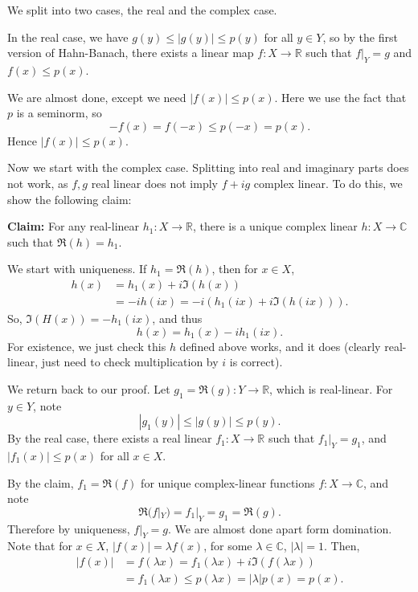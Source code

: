 \documentclass[12pt]{article}
\begin{document}
\begin{proofbox}
	We split into two cases, the real and the complex case.

	In the real case, we have $g(y) \leq |g(y)| \leq p(y)$ for all $y \in Y$, so by the first version of Hahn-Banach, there exists a linear map $f : X \to \mathbb{R}$ such that $f|_Y = g$ and $f(x) \leq p(x)$.

	We are almost done, except we need $|f(x)| \leq p(x)$. Here we use the fact that $p$ is a seminorm, so
	\[
	-f(x) = f(-x) \leq p(-x) = p(x).
	\]
	Hence $|f(x)| \leq p(x)$.

	Now we start with the complex case. Splitting into real and imaginary parts does not work, as $f, g$ real linear does not imply $f + ig$ complex linear. To do this, we show the following claim:

	\textbf{Claim:} For any real-linear $h_1 : X \to \mathbb{R}$, there is a unique complex linear $h : X \to \mathbb{C}$ such that $\Re(h) = h_1$.

	We start with uniqueness. If $h_1 = \Re(h)$, then for $x \in X$,
	\begin{align*}
		h(x) &= h_1(x) + i \Im(h(x)) \\
		     &= -i h(ix) = -i (h_1(ix) + i \Im(h(ix))).
	\end{align*}
	So, $\Im(H(x)) = - h_1(ix)$, and thus
	\[
	h(x) = h_1(x) - i h_1(ix).
	\]
	For existence, we just check this $h$ defined above works, and it does (clearly real-linear, just need to check multiplication by $i$ is correct).

	We return back to our proof. Let $g_1 = \Re(g) : Y \to \mathbb{R}$, which is real-linear. For $y \in Y$, note
	\[
	|g_1(y)| \leq |g(y)| \leq p(y).
	\]
	By the real case, there exists a real linear $f_1 : X \to \mathbb{R}$ such that $f_1|_Y = g_1$, and $|f_1(x)| \leq p(x)$ for all $x \in X$.

	By the claim, $f_1 = \Re(f)$ for unique complex-linear functions $f : X \to \mathbb{C}$, and note
	\[
	\Re(f|_Y) = f_1|_Y = g_1 = \Re(g).
	\]
	Therefore by uniqueness, $f|_Y = g$. We are almost done apart form domination. Note that for $x \in X$, $|f(x)| = \lambda f(x)$, for some $\lambda \in \mathbb{C}$, $|\lambda| = 1$. Then,
	\begin{align*}
		|f(x)| &= f(\lambda x) = f_1(\lambda x) + i \Im (f(\lambda x)) \\
		       &= f_1(\lambda x) \leq p(\lambda x) = |\lambda| p(x) = p(x).
	\end{align*}
\end{proofbox}
\end{document}
